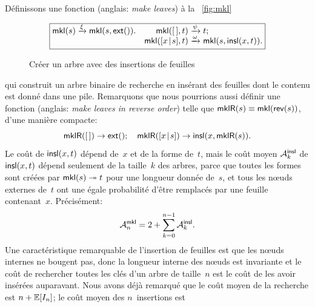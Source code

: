 \noindent Définissons une fonction 
 (anglais: \emph{make leaves}) à la
\fig~\vref{fig:mkl}
\begin{figure}
\begin{equation*}
\boxed{
\begin{array}{@{}r@{\;}l@{\;}lr@{\;}l@{\;}l@{}}
  \fun{mkl}(s) & \xrightarrow{\smash{\xi}} & \fun{mkl}(s,\fun{ext}()).
& \fun{mkl}(\el,t) & \xrightarrow{\smash{\psi}} & t;\\
& & & \fun{mkl}(\cons{x}{s},t) & \xrightarrow{\smash{\omega}} & \fun{mkl}(s,\fun{insl}(x,t)).
\end{array}}
\end{equation*}
\caption{Créer un arbre avec des insertions de feuilles}
\label{fig:mkl}
\end{figure}
qui construit un arbre binaire de recherche en insérant des feuilles
dont le contenu est donné dans une pile. Remarquons que nous pourrions
aussi définir une fonction 
(anglais: \emph{make leaves in reverse order}) telle que
\(\fun{mklR}(s) \equiv \fun{mkl}(\fun{rev}(s))\), d'une manière
compacte:
\begin{equation}
  \fun{mklR}(\el) \rightarrow \fun{ext}();
  \quad
  \fun{mklR}(\cons{x}{s}) \rightarrow \fun{insl}(x,\fun{mklR}(s)).
\label{eq:mklR}
\end{equation}
Le coût de \(\fun{insl}(x,t)\) dépend de~\(x\) et de la forme
de~\(t\), mais le coût moyen
\(\M{\fun{insl}}{k}\) de
\(\fun{insl}(x,t)\) dépend seulement de la taille~\(k\) des arbres,
parce que toutes les formes sont créées par \(\fun{mkl}(s)
\twoheadrightarrow t\) pour une longueur donnée de~\(s\), et tous les
nœuds externes de~\(t\) ont une égale probabilité d'être remplacés
par une feuille contenant~\(x\). Précisément:
\begin{equation}
\M{\fun{mkl}}{n} = 2 + \sum_{k=0}^{n-1}\M{\fun{insl}}{k}.
\label{eq:Mmkl0}
\end{equation}
Une caractéristique remarquable de l'insertion de feuilles est que les
nœuds internes ne bougent pas, donc la longueur
interne des
nœuds est invariante et le coût de rechercher toutes les clés d'un
arbre de taille~\(n\) est le coût de les avoir insérées
auparavant. Nous avons déjà remarqué que le coût moyen de la recherche
est \(n + \Expected{I_n}\); le coût moyen des \(n\)~insertions est
